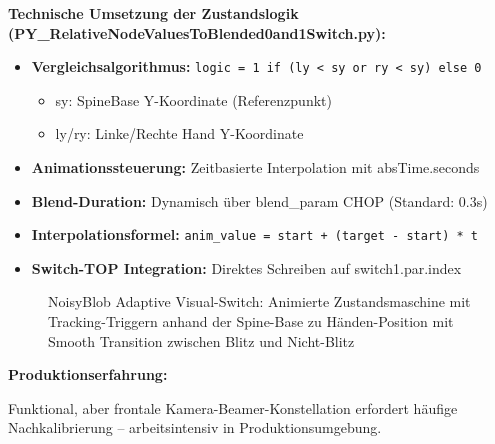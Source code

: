 \textbf{Technische Umsetzung der Zustandslogik (PY\_RelativeNodeValuesToBlended0and1Switch.py):}
\begin{itemize}
    \item \textbf{Vergleichsalgorithmus:} \texttt{logic = 1 if (ly < sy or ry < sy) else 0}
    \begin{itemize}
        \item sy: SpineBase Y-Koordinate (Referenzpunkt)
        \item ly/ry: Linke/Rechte Hand Y-Koordinate
    \end{itemize}
    \item \textbf{Animationssteuerung:} Zeitbasierte Interpolation mit absTime.seconds
    \item \textbf{Blend-Duration:} Dynamisch über blend\_param CHOP (Standard: 0.3s)
    \item \textbf{Interpolationsformel:} \texttt{anim\_value = start + (target - start) * t}
    \item \textbf{Switch-TOP Integration:} Direktes Schreiben auf switch1.par.index
\end{itemize}

\begin{figure}[htbp]
    \centering
    \caption{NoisyBlob Adaptive Visual-Switch: Animierte Zustandsmaschine mit Tracking-Triggern anhand der Spine-Base zu Händen-Position mit Smooth Transition zwischen Blitz und Nicht-Blitz}
    \label{fig:animated_switch}
\end{figure}

\textbf{Produktionserfahrung:} \raggedright Funktional, aber frontale Kamera-Beamer-Konstellation erfordert häufige Nachkalibrierung – arbeitsintensiv in Produktionsumgebung.

